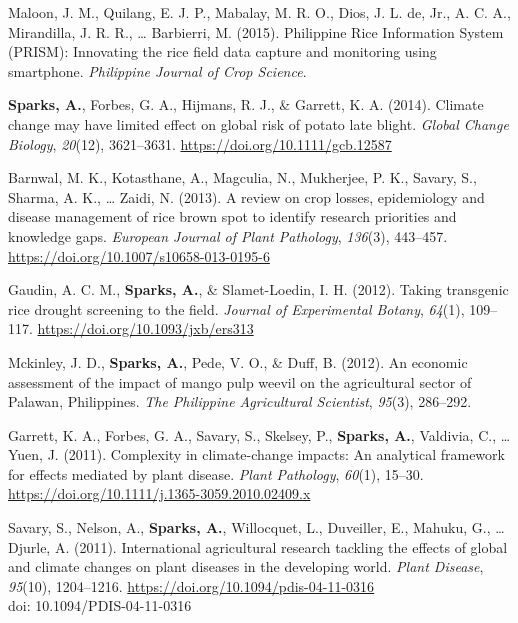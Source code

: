 \documentclass[11pt, a4paper]{awesome-cv}
\begin{document}
\leavevmode\hypertarget{ref-Maloon2015}{}%
Maloon, J. M., Quilang, E. J. P., Mabalay, M. R. O., Dios, J. L. de, Jr., A. C. A., Mirandilla, J. R. R., \ldots{} Barbierri, M. (2015). Philippine Rice Information System (PRISM): Innovating the rice field data capture and monitoring using smartphone. \emph{Philippine Journal of Crop Science}.

\leavevmode\hypertarget{ref-Sparks2014}{}%
\textbf{Sparks, A.}, Forbes, G. A., Hijmans, R. J., \& Garrett, K. A. (2014). Climate change may have limited effect on global risk of potato late blight. \emph{Global Change Biology}, \emph{20}(12), 3621--3631. \url{https://doi.org/10.1111/gcb.12587}

\leavevmode\hypertarget{ref-Barnwal2013}{}%
Barnwal, M. K., Kotasthane, A., Magculia, N., Mukherjee, P. K., Savary, S., Sharma, A. K., \ldots{} Zaidi, N. (2013). A review on crop losses, epidemiology and disease management of rice brown spot to identify research priorities and knowledge gaps. \emph{European Journal of Plant Pathology}, \emph{136}(3), 443--457. \url{https://doi.org/10.1007/s10658-013-0195-6}

\leavevmode\hypertarget{ref-Gaudin2012}{}%
Gaudin, A. C. M., \textbf{Sparks, A.}, \& Slamet-Loedin, I. H. (2012). Taking transgenic rice drought screening to the field. \emph{Journal of Experimental Botany}, \emph{64}(1), 109--117. \url{https://doi.org/10.1093/jxb/ers313}

\leavevmode\hypertarget{ref-Mckinley2012}{}%
Mckinley, J. D., \textbf{Sparks, A.}, Pede, V. O., \& Duff, B. (2012). An economic assessment of the impact of mango pulp weevil on the agricultural sector of Palawan, Philippines. \emph{The Philippine Agricultural Scientist}, \emph{95}(3), 286--292.

\leavevmode\hypertarget{ref-Garrett2011}{}%
Garrett, K. A., Forbes, G. A., Savary, S., Skelsey, P., \textbf{Sparks, A.}, Valdivia, C., \ldots{} Yuen, J. (2011). Complexity in climate-change impacts: An analytical framework for effects mediated by plant disease. \emph{Plant Pathology}, \emph{60}(1), 15--30. \url{https://doi.org/10.1111/j.1365-3059.2010.02409.x}

\leavevmode\hypertarget{ref-Savary2011}{}%
Savary, S., Nelson, A., \textbf{Sparks, A.}, Willocquet, L., Duveiller, E., Mahuku, G., \ldots{} Djurle, A. (2011). International agricultural research tackling the effects of global and climate changes on plant diseases in the developing world. \emph{Plant Disease}, \emph{95}(10), 1204--1216. \url{https://doi.org/10.1094/pdis-04-11-0316}\\
doi: 10.1094/PDIS-04-11-0316
\end{document}
